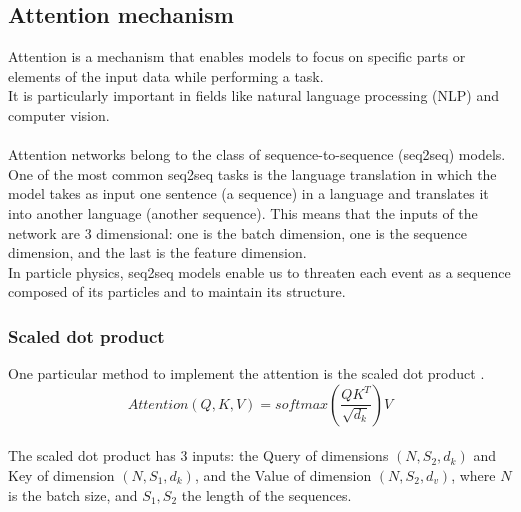 \subsection{Attention mechanism}
Attention is a mechanism that enables models to focus on specific parts or elements of the input data while performing a task.\\
It is particularly important in fields like natural language processing (NLP) and computer vision.\\
\\
Attention networks belong to the class of sequence-to-sequence (seq2seq) models. 
One of the most common seq2seq tasks is the language translation in which the model takes as input one sentence (\ie a sequence) in a language and translates it into another language (\ie another sequence).
This means that the inputs of the network are 3 dimensional: one is the batch dimension, one is the sequence dimension, and the last is the feature dimension.\\
In particle physics, seq2seq models enable us to threaten each event as a sequence composed of its particles and to maintain its structure.

\subsubsection*{Scaled dot product}
One particular method to implement the attention is the scaled dot product \cite{Vaswani2017AttentionNeed}.\\
\begin{equation}
    \textit{Attention}(Q,K,V)=\textit{softmax}\left(\frac{QK^T}{\sqrt{d_k}}\right)V
\end{equation}
\vspace{0.2cm}\\
The scaled dot product has 3 inputs: the Query of dimensions $(N, S_2, d_k)$ and Key of dimension $(N, S_1, d_k)$, and the Value of dimension $(N, S_2, d_v)$, where $N$ is the batch size, and $S_1,S_2$ the length of the sequences.\\



